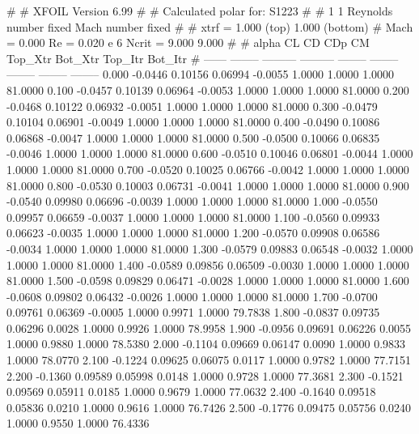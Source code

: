 #  
#       XFOIL         Version 6.99
#  
# Calculated polar for: S1223                                           
#  
# 1 1 Reynolds number fixed          Mach number fixed         
#  
# xtrf =   1.000 (top)        1.000 (bottom)  
# Mach =   0.000     Re =     0.020 e 6     Ncrit =   9.000  9.000
#  
#   alpha    CL        CD       CDp       CM     Top_Xtr  Bot_Xtr  Top_Itr  Bot_Itr
#  ------ -------- --------- --------- -------- -------- -------- -------- --------
   0.000  -0.0446   0.10156   0.06994  -0.0055   1.0000   1.0000   1.0000  81.0000
   0.100  -0.0457   0.10139   0.06964  -0.0053   1.0000   1.0000   1.0000  81.0000
   0.200  -0.0468   0.10122   0.06932  -0.0051   1.0000   1.0000   1.0000  81.0000
   0.300  -0.0479   0.10104   0.06901  -0.0049   1.0000   1.0000   1.0000  81.0000
   0.400  -0.0490   0.10086   0.06868  -0.0047   1.0000   1.0000   1.0000  81.0000
   0.500  -0.0500   0.10066   0.06835  -0.0046   1.0000   1.0000   1.0000  81.0000
   0.600  -0.0510   0.10046   0.06801  -0.0044   1.0000   1.0000   1.0000  81.0000
   0.700  -0.0520   0.10025   0.06766  -0.0042   1.0000   1.0000   1.0000  81.0000
   0.800  -0.0530   0.10003   0.06731  -0.0041   1.0000   1.0000   1.0000  81.0000
   0.900  -0.0540   0.09980   0.06696  -0.0039   1.0000   1.0000   1.0000  81.0000
   1.000  -0.0550   0.09957   0.06659  -0.0037   1.0000   1.0000   1.0000  81.0000
   1.100  -0.0560   0.09933   0.06623  -0.0035   1.0000   1.0000   1.0000  81.0000
   1.200  -0.0570   0.09908   0.06586  -0.0034   1.0000   1.0000   1.0000  81.0000
   1.300  -0.0579   0.09883   0.06548  -0.0032   1.0000   1.0000   1.0000  81.0000
   1.400  -0.0589   0.09856   0.06509  -0.0030   1.0000   1.0000   1.0000  81.0000
   1.500  -0.0598   0.09829   0.06471  -0.0028   1.0000   1.0000   1.0000  81.0000
   1.600  -0.0608   0.09802   0.06432  -0.0026   1.0000   1.0000   1.0000  81.0000
   1.700  -0.0700   0.09761   0.06369  -0.0005   1.0000   0.9971   1.0000  79.7838
   1.800  -0.0837   0.09735   0.06296   0.0028   1.0000   0.9926   1.0000  78.9958
   1.900  -0.0956   0.09691   0.06226   0.0055   1.0000   0.9880   1.0000  78.5380
   2.000  -0.1104   0.09669   0.06147   0.0090   1.0000   0.9833   1.0000  78.0770
   2.100  -0.1224   0.09625   0.06075   0.0117   1.0000   0.9782   1.0000  77.7151
   2.200  -0.1360   0.09589   0.05998   0.0148   1.0000   0.9728   1.0000  77.3681
   2.300  -0.1521   0.09569   0.05911   0.0185   1.0000   0.9679   1.0000  77.0632
   2.400  -0.1640   0.09518   0.05836   0.0210   1.0000   0.9616   1.0000  76.7426
   2.500  -0.1776   0.09475   0.05756   0.0240   1.0000   0.9550   1.0000  76.4336
